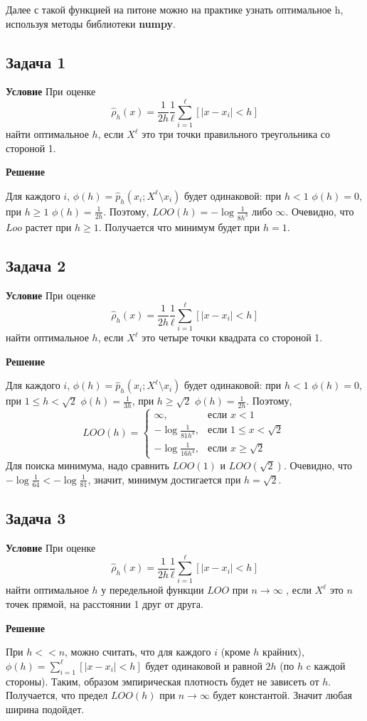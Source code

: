 Далее с такой функцией на питоне можно на практике узнать оптимальное h, используя методы библиотеки \textbf{numpy}.

\subsection*{Задача 1}
\textbf{Условие} 
При оценке
\[
\hat{\rho}_h(x) = \frac{1}{2h} \frac{1}{\ell} \sum_{i=1}^{\ell} \left[ |x - x_i| < h \right]
\]
найти оптимальное $h$, если $X^\ell$ это три точки правильного треугольника со стороной 1.

\textbf{Решение} 

Для каждого $i$, $\phi(h) = \hat{p}_h(x_i; X^\ell \setminus x_i)$ будет одинаковой: при $h < 1$ $\phi(h) = 0$, при $h \geq 1$ $\phi(h) = \frac{1}{2h}$. Поэтому, $LOO(h) = -\log{\frac{1}{8h^3}}$ либо $\infty$. Очевидно, что $Loo$ растет при $h \geq 1$. Получается что минимум будет при $h = 1$.

\subsection*{Задача 2}
\textbf{Условие} 
При оценке
\[
\hat{\rho}_h(x) = \frac{1}{2h} \frac{1}{\ell} \sum_{i=1}^{\ell} \left[ |x - x_i| < h \right]
\]
найти оптимальное $h$, если $X^\ell$ это четыре точки квадрата со стороной 1.

\textbf{Решение} 

Для каждого $i$, $\phi(h) = \hat{p}_h(x_i; X^\ell \setminus x_i)$ будет одинаковой: при $h < 1$ $\phi(h) = 0$, при $1 \leq h < \sqrt{2}$ $\phi(h) = \frac{1}{3h}$, при $h \geq \sqrt{2}$ $\phi(h) = \frac{1}{2h}$. Поэтому, 
\[
LOO(h) = 
\begin{cases} 
\infty, & \text{если } x < 1 \\
-\log{\frac{1}{81h^4}}, & \text{если } 1 \leq x < \sqrt{2} \\
-\log{\frac{1}{16h^4}}, & \text{если } x \geq \sqrt{2} 
\end{cases}
\]
Для поиска минимума, надо сравнить $LOO(1)$ и $LOO(\sqrt{2})$. Очевидно, что $-\log{\frac{1}{64}} < -\log{\frac{1}{81}}$, значит, минимум достигается при $h = \sqrt{2}$.

\subsection*{Задача 3}
\textbf{Условие} 
При оценке
\[
\hat{\rho}_h(x) = \frac{1}{2h} \frac{1}{\ell} \sum_{i=1}^{\ell} \left[ |x - x_i| < h \right]
\]
найти оптимальное $h$ у передельной функции $LOO$ при $n \to \infty$ , если $X^\ell$ это $n$ точек прямой, на расстоянии 1 друг от друга.

\textbf{Решение} 

При $h << n$, можно считать, что для каждого $i$ (кроме $h$ крайних), $\phi(h) = \sum_{i=1}^{\ell} \left[ |x - x_i| < h \right]$ будет одинаковой и равной $2h$ (по $h$ c каждой стороны). Таким, образом эмпирическая плотность будет не зависеть от $h$. Получается, что предел $LOO(h)$ при $n \to \infty$ будет константой. Значит любая ширина подойдет.
